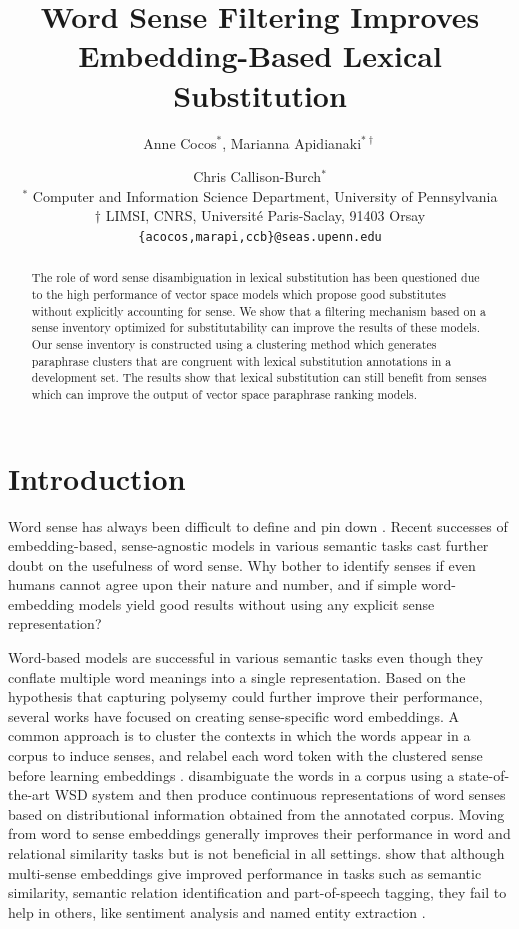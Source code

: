 \documentclass[11pt]{article}
\title{Word Sense Filtering Improves Embedding-Based Lexical Substitution}
\author{Anne Cocos$^{*}$, Marianna Apidianaki$^{*\dag}$ \and Chris Callison-Burch$^{*}$\\
$^{*}$ Computer and Information Science Department, University of Pennsylvania \\ 
$\dag$ LIMSI, CNRS, Universit\'e Paris-Saclay, 91403 Orsay \\
{\tt \{acocos,marapi,ccb\}@seas.upenn.edu} \\}
\date{}
\begin{document}
\maketitle
\begin{abstract}

The role of word sense disambiguation in lexical substitution has been questioned due to the high performance of vector space models which propose good substitutes without explicitly accounting for sense. We show that a filtering mechanism based on a sense inventory optimized for substitutability can improve the results of these models. Our sense inventory is constructed using a clustering method which generates paraphrase clusters that are congruent with lexical substitution annotations in a development set. The results show that lexical substitution can still benefit from senses which can improve the output of vector space paraphrase ranking models.

\end{abstract}

\section{Introduction}

Word sense has always been difficult to define and pin down \cite{kilgarriff1997don,ErketalCL2013}. Recent successes of embedding-based, sense-agnostic models in various semantic tasks cast further doubt on the usefulness of word sense. Why bother to identify senses if even humans cannot agree upon their nature and number, and if simple word-embedding models yield good results without using any explicit sense representation?  

Word-based models are   successful in various semantic tasks even though they conflate multiple word meanings into a single representation. Based on the hypothesis that capturing polysemy 
could further improve their performance, several works have focused on creating sense-specific word embeddings. 
A common approach is to cluster the contexts in which the words appear in a corpus to induce senses, and relabel each word token with the clustered sense before learning embeddings \cite{reisinger-mooney:2010:NAACLHLT,huang-EtAl:2012:ACL20122}. 
 disambiguate the words in a corpus using a state-of-the-art WSD system and then produce continuous representations of word senses based on distributional information obtained from the annotated corpus. 
Moving from word to sense embeddings generally improves their performance in word and relational similarity tasks but is not beneficial in all settings. 
 show that although multi-sense embeddings give improved performance in tasks such as semantic similarity, semantic relation identification and part-of-speech tagging, they fail to help in others, like sentiment analysis and named entity extraction \cite{li-jurafsky:2015:EMNLP}. 
\end{document}
